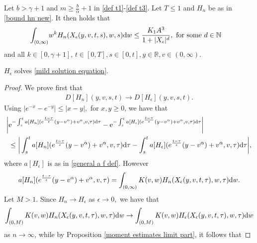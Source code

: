 \documentclass[11pt]{article}
\numberwithin{equation}{section}
\newcommand{\der}{\textup{d}}
\begin{document}
\begin{prop}\label{moment estimates limit part}


 Let $b>\gamma+1$ and $m\geq \frac{b}{\alpha}+1$ in \eqref{def t1}-\eqref{def t3}. Let $T\leq 1$ and $H_{n}$ be as in \eqref{bound hn new}. It then holds that
\begin{align}
    \int_{(0,\infty)}& w^{k}H_{n}(X_{\epsilon}(y,v,t,s),w,s)\der w\leq \frac{K_{1}A^{3}}{1+|X_{\epsilon}|^{d}}, \textup{ for some } d\in\mathbb{N}
\end{align}
and all $k\in[0,\gamma+1]$, $t\in[0,T], s\in[0,t], y\in\mathbb{R}, v\in(0,\infty).$
\end{prop}
\begin{prop}
$H_{\epsilon}$ solves \eqref{mild solution equation}.
\end{prop}
\begin{proof}
We prove first that 
\begin{align*}
D[H_{n}](y,v,s,t)\rightarrow D[H_{\epsilon}](y,v,s,t).
\end{align*}
Using $|e^{-x}-e^{-y}|\leq |x-y|, $ for $x,y\geq 0$, we have that
\begin{align*}
\bigg| & \textup{e}^{-\int_{s}^{t} a[H_{n}](e^{\frac{t-\tau}{\epsilon}}(y-v^{\alpha})+v^{\alpha},v,\tau)\der\tau}-\textup{e}^{-\int_{s}^{t}a[H_{\epsilon}](e^{\frac{t-\tau}{\epsilon}}(y-v^{\alpha})+v^{\alpha},v,\tau)\der\tau}\bigg|\\
&\leq \bigg|\int_{s}^{t}a[H_{n}](e^{\frac{t-\tau}{\epsilon}}(y-v^{\alpha})+v^{\alpha},v,\tau)\der\tau-\int_{s}^{t}a[H_{\epsilon}](e^{\frac{t-\tau}{\epsilon}}(y-v^{\alpha})+v^{\alpha},v,\tau)\der\tau\bigg|,
\end{align*}
where $a[H_{\epsilon}]$ is as in \eqref{general a f def}. However
\begin{align*}
    a[H_{n}](e^{\frac{t-\tau}{\epsilon}}(y-v^{\alpha})+v^{\alpha},v,\tau)= \int_{(0,\infty)}K(v,w)H_{n}(X_{\epsilon}(y,v,t,\tau),w,\tau)\der w.
\end{align*}
Let $M>1$. Since $H_{n}\rightarrow H_{\epsilon}$ as $\epsilon\rightarrow 0,$ we have that
\begin{align*}
    \int_{(0,M)}K(v,w)H_{n}(X_{\epsilon}(y,v,t,\tau),w,\tau)\der w \rightarrow \int_{(0,M)}K(v,w)H_{\epsilon}(X_{\epsilon}(y,v,t,\tau),w,\tau)\der w
\end{align*}
as $n\rightarrow\infty$, while by Proposition \ref{moment estimates limit part}, it follows that


\end{proof}
\end{document}
